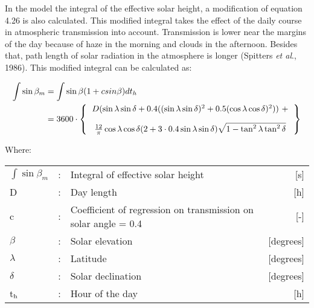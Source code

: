 In the model the integral of the effective solar height, a modification of equation 4.26 is
also calculated. This modified integral takes the effect of the daily course in atmos\-pheric
transmis\-sion into account. Transmission is lower near the margins of the day because of
haze in the morning and clouds in the afternoon. Besides that, path length of solar
radiation in the atmosphere is longer (Spitters {\it et al}., 1986). This modified integral can be calculated as:

\begin{align}
\int \sin \beta_{m} &= \int \sin \beta (1+csin \beta ) dt_{h}  \\
                    &= 3600 \cdot \left \{
                    \begin{tabular}{c}
                        $D ( \sin \lambda \sin \delta + 0.4 
                            (( \sin \lambda \sin \delta )^{2} + 0.5( 
                            \cos \lambda \cos \delta ) ^{2} )) ~ + \nonumber$ \\[1em]
                        ${\frac{12}{\pi}} \cos \lambda \cos 
                            \delta (2+3 \cdot 0.4 \sin \lambda \sin \delta ) 
                            \sqrt{1-\tan^{2} \lambda \tan^{2} \delta } \nonumber$
                    \end{tabular}
                    \right \}
\end{align}

Where:\\[5pt]
\begin{tabularx}{\textwidth}{llXr}
$\int \sin \beta_{m}$  &:& Integral of effective solar height       & [s]\\
D  &:& Day length       & [h]\\
c  &:& Coefficient of regression on transmission on solar angle = 0.4       & [-]\\
$\beta$  &:& Solar elevation        & [degrees]\\
$\lambda$  &:& Latitude       & [degrees]\\
$\delta$  &:& Solar declination       & [degrees]\\
t$_{{\rm h}}$  &:& Hour of the day       & [h]\\
\end{tabularx}

